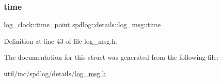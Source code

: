 \subsubsection{\texorpdfstring{time}{time}}
{\footnotesize\ttfamily log\+\_\+clock\+::time\+\_\+point spdlog\+::details\+::log\+\_\+msg\+::time}



Definition at line 43 of file log\+\_\+msg.\+h.



The documentation for this struct was generated from the following file\+:\begin{DoxyCompactItemize}
\item 
util/inc/spdlog/details/\hyperlink{log__msg_8h}{log\+\_\+msg.\+h}\end{DoxyCompactItemize}
